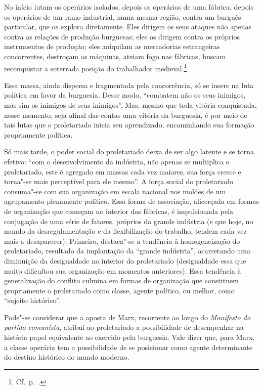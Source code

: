 \begin{hedraquote} 
No início lutam os operários isolados, depois os operários de uma
fábrica, depois os operários de um ramo industrial, numa mesma região,
contra um burguês particular, que os explora diretamente. Eles dirigem os seus
ataques não apenas contra as relações de produção burguesas; eles os
dirigem contra os próprios instrumentos de produção; eles aniquilam as
mercadorias estrangeiras concorrentes, destroçam as máquinas, ateiam
fogo nas fábricas, buscam reconquistar a soterrada posição do
trabalhador medieval.\footnote{ Cf.~p.~\pageref{6}.}
\end{hedraquote} 

Essa massa, ainda dispersa e fragmentada pela concorrência, só
se insere na luta política em favor da burguesia. Desse modo,
“combatem não os seus inimigos, mas sim os inimigos de seus inimigos”.
Mas, mesmo que toda vitória conquistada, nesse momento, seja afinal das
contas uma vitória da burguesia, é por meio de tais lutas que o
proletariado inicia seu aprendizado, encaminhando sua formação
propriamente política.

Só mais tarde, o poder social do proletariado deixa de ser algo latente
e se torna efetivo: “com o desenvolvimento da indústria, não apenas
se multiplica o proletariado, este é agregado em massas cada vez maiores,
sua força cresce e torna"-se mais perceptível para ele mesmo”. A força
social do proletariado consuma"-se com sua organização em escala
nacional nos moldes de um agrupamento plenamente político. Essa forma
de associação, alicerçada em formas de organização que começam no
interior das fábricas, é impulsionada pela conjugação de uma série de
fatores, próprios da grande indústria (e que hoje, no mundo da
desregulamentação e da flexibilização do trabalho, tendem cada vez mais
a desaparecer). Primeiro, destaca"-se a tendência à homogeneização do
proletariado, resultado da implantação da “grande indústria”,
acarretando uma diminuição da desigualdade no interior do proletariado
(desigualdade essa que muito dificultou sua organização em momentos
anteriores). Essa tendência à generalização do conflito culmina em
formas de organização que constituem propriamente o proletariado como
classe, agente político, ou melhor, como “sujeito histórico”.

Pode"-se considerar que a aposta de Marx, recorrente ao longo do
\textit{Manifesto do partido comunista}, atribui ao proletariado a
possibilidade de desempenhar na história papel equivalente ao exercido
pela burguesia. Vale dizer que, para Marx, a classe operária tem a
possibilidade de se posicionar como agente determinante do destino
histórico do mundo moderno. 

